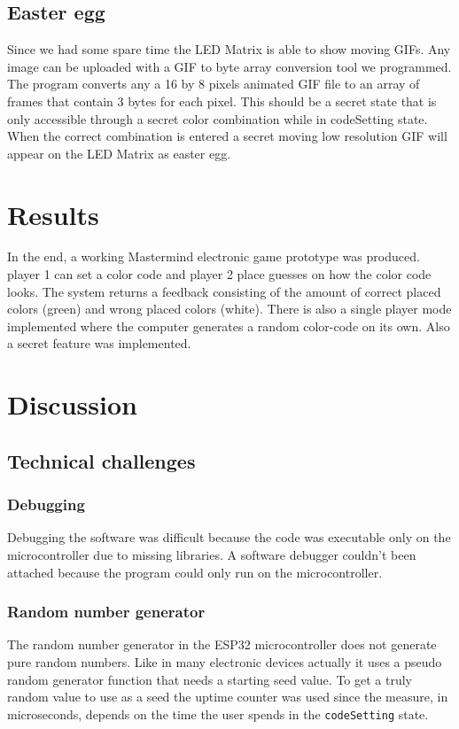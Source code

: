 \documentclass[a4paper, 11pt]{article}
\begin{document}
\subsection{Easter egg}
Since we had some spare time the LED Matrix is able to show moving GIFs.
Any image can be uploaded with a GIF to byte array conversion tool we
programmed. The program converts any a 16 by 8 pixels animated GIF file
to an array of frames that contain 3 bytes for each pixel.
This should be a secret state that is only accessible through a secret
color combination while in codeSetting state. When the correct
combination is entered a secret moving low resolution GIF will appear on
the LED Matrix as easter egg.

\section{Results}
In the end, a working Mastermind electronic game prototype was produced.
player 1 can set a color code and player 2 place guesses on how the color code
looks. The system returns a feedback consisting of the amount of correct
placed colors (green) and wrong placed colors (white). There is also a single
player mode implemented where the computer generates a random color-code on
its own. Also a secret feature was implemented. 

\section{Discussion}
\subsection{Technical challenges}
\subsubsection{Debugging}
Debugging the software was difficult because the code was executable
only on the microcontroller due to missing libraries. A software
debugger couldn’t been attached because the program could only run on
the microcontroller. 

\subsubsection{Random number generator}
The random number generator in the ESP32 microcontroller does not
generate pure random numbers. Like in many electronic devices actually
it uses a pseudo random generator function that needs a starting seed
value. To get a truly random value to use as a seed the uptime counter
was used since the measure, in microseconds, depends on the time the
user spends in the {\tt codeSetting} state.
\end{document}
